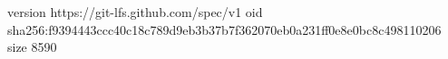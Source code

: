 version https://git-lfs.github.com/spec/v1
oid sha256:f9394443ccc40c18c789d9eb3b37b7f362070eb0a231ff0e8e0bc8c498110206
size 8590
